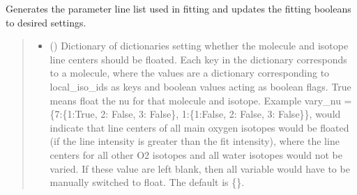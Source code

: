 \documentclass[letterpaper,10pt,english]{sphinxmanual}
\begin{document}
\begin{fulllineitems}
\begin{fulllineitems}
\label{\detokenize{MATS:MATS.generate_fitparam_file.Generate_FitParam_File.generate_fit_param_linelist_from_linelist}}
\pysigstartsignatures
{}
\pysigstopsignatures
\sphinxAtStartPar
Generates the parameter line list used in fitting and updates the fitting booleans to desired settings.
\begin{quote}\begin{description}
\begin{itemize}
\item {} 
\sphinxAtStartPar
{} (\sphinxstyleliteralemphasis{\sphinxupquote{, }}) \textendash{} Dictionary of dictionaries setting whether the molecule and isotope line centers should be floated.  Each key in the dictionary corresponds to a molecule, where the values are a dictionary corresponding to local\_iso\_ids as keys and boolean values acting as boolean flags. True means float the nu for that molecule and isotope. Example vary\_nu = \{7:\{1:True, 2: False, 3: False\}, 1:\{1:False, 2: False, 3: False\}\}, would indicate that line centers of all main oxygen isotopes would be floated (if the line intensity is greater than the fit intensity), where the line centers for all other O2 isotopes and all water isotopes would not be varied. If these value are left blank, then all variable would have to be manually switched to float. The default is \{\}.


\end{itemize}
\end{description}
\end{quote}
\end{fulllineitems}
\end{fulllineitems}
\end{document}
